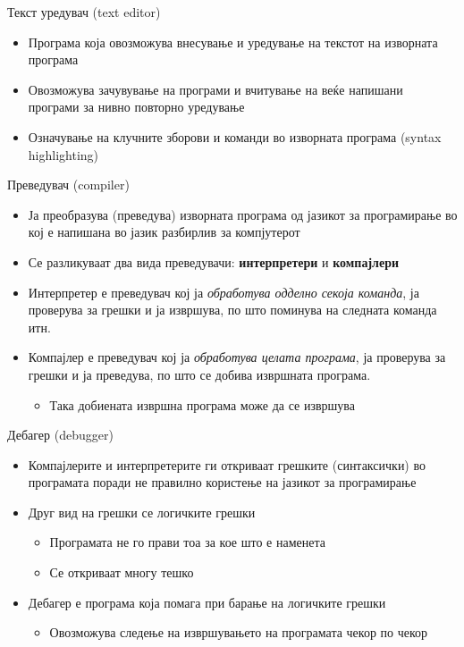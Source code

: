 \begin{frame}{Текст уредувач (text editor)}
\begin{itemize}
  \item Програма која овозможува внесување и уредување на текстот на изворната
  програма
  \item Овозможува зачувување на програми и вчитување на веќе напишани програми
  за нивно повторно уредување 
  \item Означување на клучните зборови и команди во изворната програма (syntax
  highlighting)
\end{itemize}
\end{frame}

\begin{frame}{Преведувач (compiler)}
\begin{itemize}
  \item Ја преобразува (преведува) изворната програма од јазикот за програмирање
  во кој е напишана во јазик разбирлив за компјутерот
  \item Се разликуваат два вида преведувачи: \textbf{интерпретери} и \textbf{компајлери} 
  \item Интерпретер е преведувач кој ја \emph{обработува одделно секоја команда}, ја
  проверува за грешки и ја извршува, по што поминува на следната команда  итн.
  \item Компајлер е преведувач кој ја \emph{обработува целата програма}, ја проверува
  за грешки и ја преведува, по што се добива извршната програма.
  \begin{itemize}
  \item Така добиената извршна програма може да се извршува
  \end{itemize}
\end{itemize}
\end{frame}

\begin{frame}{Дебагер (debugger)}
\begin{itemize}
  \item Компајлерите и интерпретерите ги откриваат грешките (синтаксички) во
  програмата поради не правилно користење на јазикот за програмирање
  \item Друг вид на грешки се логичките грешки
  \begin{itemize}
  \item Програмата не го прави тоа за кое што е наменета 
  \item Се откриваат многу тешко
  \end{itemize}
  \item Дебагер е програма која помага при барање на логичките грешки
  \begin{itemize}
  \item Овозможува следење на извршувањето на програмата чекор по чекор
  \end{itemize}
\end{itemize}
\end{frame}

